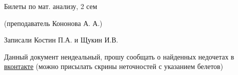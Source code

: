 \documentclass[11pt, fleqn]{article}
\begin{document}
  \begin{center}
    \huge Билеты по мат. анализу, 2 сем

    \Large (преподаватель Кононова А. А.)

    \large Записали Костин П.А. и Щукин И.В.
  \end{center}

  Данный документ неидеальный, прошу сообщать о найденных недочетах в \href{https://vk.com/drab_existence_a}{вконтакте} (можно присылать скрины неточностей с указанием белетов)
  \tableofcontents
  \newpage

  

  

  

  

  

  

  
\end{document}
